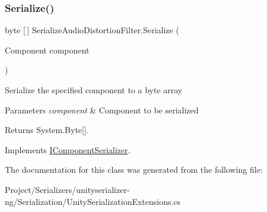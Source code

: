 \subsubsection{\texorpdfstring{Serialize()}{Serialize()}}
{\footnotesize\ttfamily byte \mbox{[}$\,$\mbox{]} Serialize\+Audio\+Distortion\+Filter.\+Serialize (\begin{DoxyParamCaption}\item[{Component}]{component }\end{DoxyParamCaption})\hspace{0.3cm}{\ttfamily [inline]}}



Serialize the specified component to a byte array 


\begin{DoxyParams}{Parameters}
{\em component} & Component to be serialized\\
\hline
\end{DoxyParams}
\begin{DoxyReturn}{Returns}
System.\+Byte\mbox{[}\mbox{]}.
\end{DoxyReturn}


Implements \hyperlink{interface_i_component_serializer_ab2aa38005665496b62d6c54b5f0dbd31}{I\+Component\+Serializer}.



The documentation for this class was generated from the following file\+:\begin{DoxyCompactItemize}
\item 
Project/\+Serializers/unityserializer-\/ng/\+Serialization/Unity\+Serialization\+Extensions.\+cs\end{DoxyCompactItemize}
